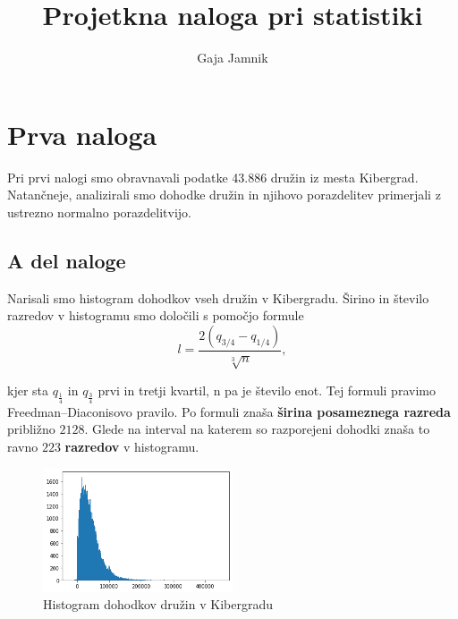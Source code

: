 \documentclass{article}
\title{Projetkna naloga pri statistiki}
\author{Gaja Jamnik}
\date{}
\begin{document}
    \maketitle


\section{Prva naloga}\label{nal1}

Pri prvi nalogi smo obravnavali podatke 43.886 družin iz mesta Kibergrad. Natančneje, analizirali smo dohodke
družin in njihovo porazdelitev primerjali z ustrezno normalno porazdelitvijo.

\subsection{A del naloge}

Narisali smo histogram dohodkov vseh družin v Kibergradu. 
Širino in število razredov v histogramu smo določili s pomočjo formule
\begin{equation}
    l = \frac{2(q_{3/4} - q_{1/4})}{\sqrt[3]{n}},
\end{equation}

kjer sta $q_{\frac{1}{4}}$ in $q_{\frac{3}{4}}$ prvi in tretji kvartil, n pa je število enot.
Tej formuli pravimo Freedman–Diaconisovo pravilo. Po formuli znaša \textbf{širina posameznega razreda} približno $2128$.
Glede na interval na katerem so razporejeni dohodki znaša to ravno $223$ \textbf{razredov} v histogramu.

\begin{figure}[H]
    \begin{center}
        \includegraphics*[width=0.5\textwidth]{figure1A.png}
        \caption{Histogram dohodkov družin v Kibergradu}
        \label{hist_dohodki}
    \end{center}
\end{figure}
\end{document}
